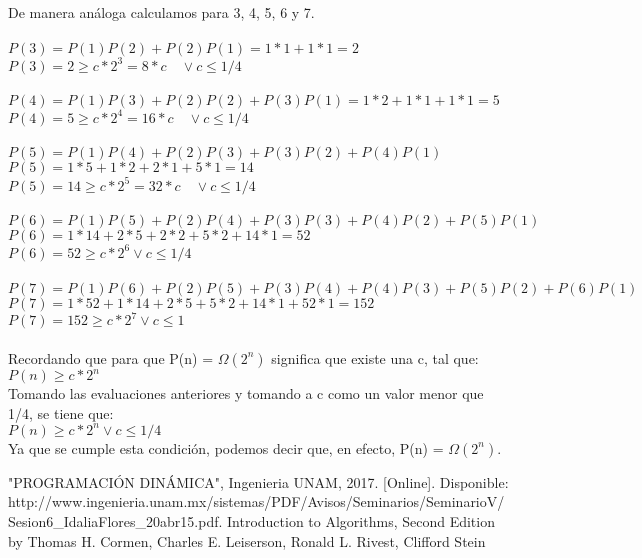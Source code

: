 \documentclass[12pt,twoside]{article}
\begin{document}
De manera análoga calculamos para 3, 4, 5, 6 y 7.\\\\
$P(3) = P(1)P(2) + P(2)P(1) = 1*1 + 1*1 = 2$\\
$P(3) = 2 \geq c*2^3 = 8*c \quad \vee c \leq 1/4$\\\\

$P(4) = P(1)P(3) + P(2)P(2) + P(3)P(1) = 1*2 + 1*1 + 1*1 = 5$\\
$P(4) = 5 \geq c*2^4 = 16*c \quad \vee c \leq 1/4$\\\\

$P(5) = P(1)P(4) + P(2)P(3) +P(3)P(2)+P(4)P(1)$\\
$P(5) = 1*5 + 1*2 + 2*1 + 5*1 = 14$\\
$P(5) = 14 \geq c*2^5 = 32*c \quad \vee c \leq 1/4$\\\\

$P(6) = P(1)P(5) + P(2)P(4) +P(3)P(3)+P(4)P(2)+P(5)P(1)$\\     $P(6) = 1*14 + 2*5 + 2*2 + 5*2 + 14*1 = 52$\\
$P(6) = 52 \geq c*2^6 \vee c \leq 1/4$\\\\

$P(7) = P(1)P(6) + P(2)P(5) +P(3)P(4)+P(4)P(3)+P(5)P(2) + P(6)P(1)$\\
$P(7) = 1*52 + 1*14 + 2*5 + 5*2 + 14*1 + 52*1= 152$\\
$P(7) = 152 \geq c*2^7 \vee c \leq 1$\\\\
Recordando que para que P(n) = $\Omega(2^n)$ significa que existe una c, tal que:\\
$P(n) \geq c*2^n$\\
Tomando las evaluaciones anteriores y tomando a c como un valor menor que 1/4, se tiene que:\\
$P(n) \geq c*2^n \vee c \leq 1/4$\\
Ya que se cumple esta condición, podemos decir que, en efecto, 
P(n) = $\Omega(2^n)$.\\ 

\begin{thebibliography}{9}
"PROGRAMACIÓN DINÁMICA", Ingenieria UNAM, 2017. [Online]. Disponible: http://www.ingenieria.unam.mx/sistemas/PDF/Avisos/Seminarios/SeminarioV/Sesion6\_IdaliaFlores\_20abr15.pdf.
 Introduction to Algorithms, Second Edition by Thomas H. Cormen, Charles E. Leiserson, Ronald L. Rivest, Clifford Stein

\end{thebibliography}
\end{document}
